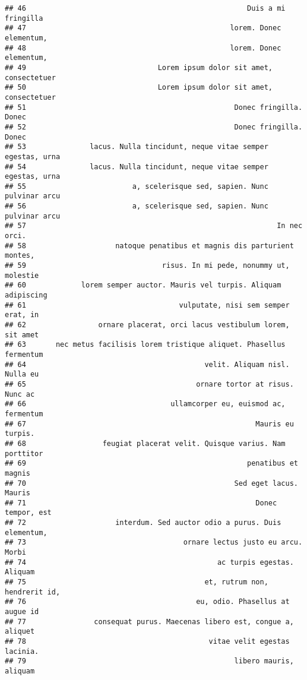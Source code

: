 \documentclass[
]{article}
\begin{document}
\begin{verbatim}
## 46                                                    Duis a mi fringilla
## 47                                                lorem. Donec elementum,
## 48                                                lorem. Donec elementum,
## 49                               Lorem ipsum dolor sit amet, consectetuer
## 50                               Lorem ipsum dolor sit amet, consectetuer
## 51                                                 Donec fringilla. Donec
## 52                                                 Donec fringilla. Donec
## 53               lacus. Nulla tincidunt, neque vitae semper egestas, urna
## 54               lacus. Nulla tincidunt, neque vitae semper egestas, urna
## 55                         a, scelerisque sed, sapien. Nunc pulvinar arcu
## 56                         a, scelerisque sed, sapien. Nunc pulvinar arcu
## 57                                                           In nec orci.
## 58                     natoque penatibus et magnis dis parturient montes,
## 59                                risus. In mi pede, nonummy ut, molestie
## 60             lorem semper auctor. Mauris vel turpis. Aliquam adipiscing
## 61                                    vulputate, nisi sem semper erat, in
## 62                 ornare placerat, orci lacus vestibulum lorem, sit amet
## 63       nec metus facilisis lorem tristique aliquet. Phasellus fermentum
## 64                                          velit. Aliquam nisl. Nulla eu
## 65                                        ornare tortor at risus. Nunc ac
## 66                                  ullamcorper eu, euismod ac, fermentum
## 67                                                      Mauris eu turpis.
## 68                  feugiat placerat velit. Quisque varius. Nam porttitor
## 69                                                    penatibus et magnis
## 70                                                 Sed eget lacus. Mauris
## 71                                                      Donec tempor, est
## 72                     interdum. Sed auctor odio a purus. Duis elementum,
## 73                                     ornare lectus justo eu arcu. Morbi
## 74                                             ac turpis egestas. Aliquam
## 75                                          et, rutrum non, hendrerit id,
## 76                                        eu, odio. Phasellus at augue id
## 77                consequat purus. Maecenas libero est, congue a, aliquet
## 78                                           vitae velit egestas lacinia.
## 79                                                 libero mauris, aliquam

\end{verbatim}
\end{document}
